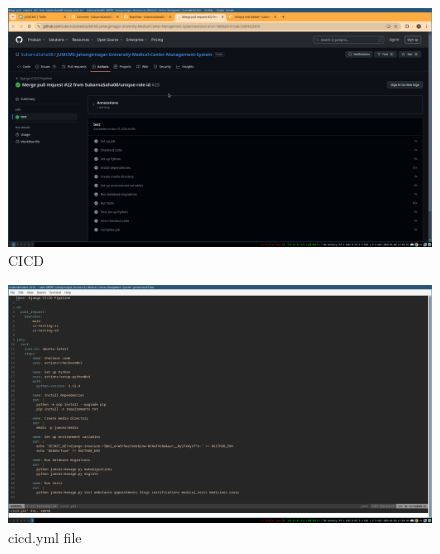 \documentclass[a4paper,12pt]{article}
\begin{document}
\begin{figure}[H]
    \centering
    \includegraphics[width=1\textwidth]{images/meet48.png}
    \caption{CICD}
    \label{fig:meet48}
\end{figure}

\begin{figure}[H]
    \centering
    \includegraphics[width=1\textwidth]{images/meet410.png}
    \caption{cicd.yml file}
    \label{fig:meet410}
\end{figure}
\newpage
\end{document}
